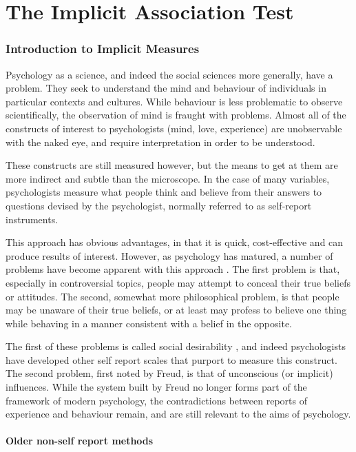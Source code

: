 \part{The Implicit Association Test}
\label{part:impl-assoc-test}
\section{Introduction to Implicit Measures}
\label{sec:intr-impl-meas}
Psychology as a science, and indeed the social sciences more generally, have a problem. They seek to understand the mind and behaviour of individuals in particular contexts and cultures. While behaviour is less problematic to observe scientifically, the observation of mind is fraught with problems. Almost all of the constructs of interest to psychologists (mind, love, experience) are unobservable with the naked eye, and require interpretation in order to be understood. 

These constructs are still measured however, but the means to get at them are more indirect and subtle than the microscope. In the case of many variables, psychologists measure what people think and believe from their answers to questions devised by the psychologist, normally referred to as self-report instruments. 

This approach has obvious advantages, in that it is quick, cost-effective and can produce results of interest. However, as psychology has matured, a number of problems have become apparent with this approach \cite{Nisbett1977}.  The first problem is that, especially in controversial topics, people may attempt to conceal their true beliefs or attitudes. The second, somewhat more philosophical problem, is that people may be unaware of their true beliefs, or at least may profess to believe one thing while behaving in a manner consistent with a belief in the opposite. 

The first of these problems is called social desirability \cite{Egloff2003}, and indeed psychologists have developed other self report scales that purport to measure this construct. The second problem, first noted by Freud, is that of unconscious (or implicit) influences. While the system built by Freud no longer forms part of the framework of modern psychology, the contradictions between reports of experience and behaviour remain, and are still relevant to the aims of psychology. %

\subsection{Older non-self report methods}

